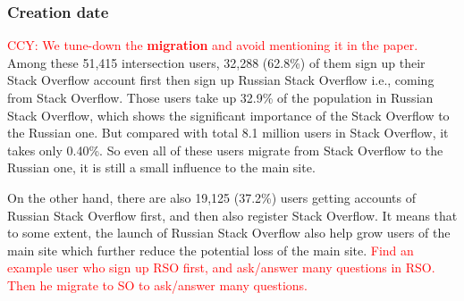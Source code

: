 \subsubsection{Creation date}
\textcolor{red}{CCY: We tune-down the \textbf{migration} and avoid mentioning it in the paper.}
Among these 51,415 intersection users, 32,288 (62.8\%) of them sign up their  Stack Overflow account first then sign up Russian Stack Overflow i.e., coming from Stack Overflow.
Those users take up 32.9\% of the population in Russian Stack Overflow, which shows the significant importance of the Stack Overflow to the Russian one.
But compared with total 8.1 million users in Stack Overflow, it takes only 0.40\%.
So even all of these users migrate from Stack Overflow to the Russian one, it is still a small influence to the main site.


On the other hand, there are also 19,125 (37.2\%) users getting accounts of Russian Stack Overflow first, and then also register Stack Overflow.
It means that to some extent, the launch of Russian Stack Overflow also help 
grow users of the main site which further reduce the potential loss of the main site.
\textcolor{red}{Find an example user who sign up RSO first, and ask/answer many questions in RSO. Then he migrate to SO to ask/answer many questions.}
 
